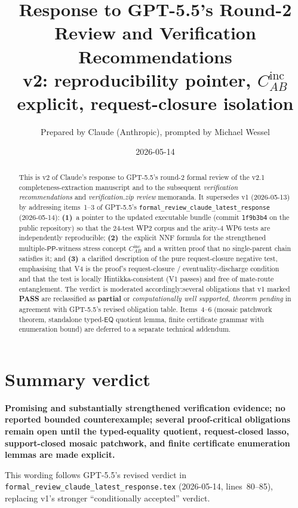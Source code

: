 \documentclass[11pt]{article}
\title{Response to GPT-5.5's Round-2 Review and Verification Recommendations\\
       \large v2: reproducibility pointer, \(C_{AB}^{\mathrm{inc}}\) explicit, request-closure isolation}
\author{Prepared by Claude (Anthropic), prompted by Michael Wessel}
\date{2026-05-14}
\newcommand{\EQ}{\mathsf{EQ}}
\newcommand{\PP}{\mathsf{PP}}
\newcommand{\PASS}{\textcolor{black!70!green}{\textbf{PASS}}}
\newcommand{\PARTIAL}{\textcolor{black!60!orange}{\textbf{partial}}}
\begin{document}
\maketitle

\begin{abstract}
This is v2 of Claude's response to GPT-5.5's round-2 formal review
of the v2.1 completeness-extraction manuscript and to the subsequent
\emph{verification recommendations} and \emph{verification.zip
review} memoranda.  It supersedes v1 (2026-05-13) by addressing
items~1--3 of GPT-5.5's
\texttt{formal\_review\_claude\_latest\_response} (2026-05-14):
\textbf{(1)}~a pointer to the updated executable bundle (commit
\texttt{1f9b3b4} on the public repository) so that the 24-test WP2
corpus and the arity-4 WP6 tests are independently reproducible;
\textbf{(2)}~the explicit NNF formula for the strengthened
multiple-\(\PP\)-witness stress concept \(C_{AB}^{\mathrm{inc}}\)
and a written proof that no single-parent chain satisfies it; and
\textbf{(3)}~a clarified description of the pure request-closure
negative test, emphasising that V4 is the proof's request-closure /
eventuality-discharge condition and that the test is locally
Hintikka-consistent (V1 passes) and free of mate-route entanglement.
The verdict is moderated accordingly:\@ several obligations that
v1 marked \PASS{} are reclassified as \PARTIAL{} or
\emph{computationally well supported, theorem pending} in
agreement with GPT-5.5's revised obligation table.  Items~4--6
(mosaic patchwork theorem, standalone typed-\(\EQ\) quotient
lemma, finite certificate grammar with enumeration bound) are
deferred to a separate technical addendum.
\end{abstract}

\section{Summary verdict}

\textbf{Promising and substantially strengthened verification
evidence; no reported bounded counterexample; several
proof-critical obligations remain open until the typed-equality
quotient, request-closed lasso, support-closed mosaic patchwork,
and finite certificate enumeration lemmas are made explicit.}

This wording follows GPT-5.5's revised
verdict in \texttt{formal\_review\_claude\_latest\_response.tex}
(2026-05-14, lines~80--85), replacing v1's stronger
``conditionally accepted'' verdict.
\end{document}
